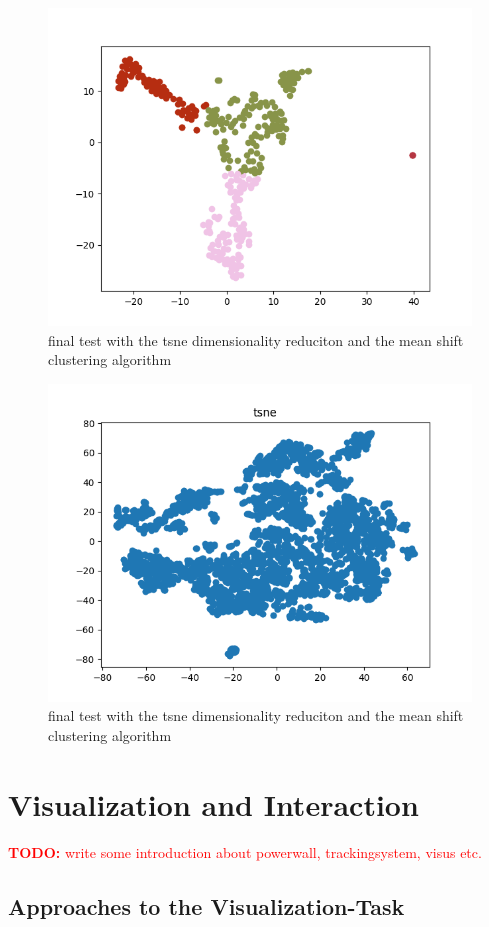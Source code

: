 \documentclass[journal]{vgtc}       %
\newcommand{\todo}[1]{\textcolor{red}{\textbf{TODO:} #1}}
\begin{document}
\begin{figure}[tb]
	\begin{center}
		\includegraphics[width=.75\linewidth]{MS-tsne.png}
	\end{center}
	\caption{\label{fig:tsne} final test with the tsne dimensionality reduciton and the mean shift clustering algorithm }
\end{figure}

\begin{figure}[tb]
	\begin{center}
		\includegraphics[width=.75\linewidth]{tsneFull.png}
	\end{center}
	\caption{\label{fig:tsnef} final test with the tsne dimensionality reduciton and the mean shift clustering algorithm }
\end{figure}

\section{Visualization and Interaction}
\todo{write some introduction about powerwall, trackingsystem, visus etc.}
\subsection{Approaches to the Visualization-Task}
\end{document}
